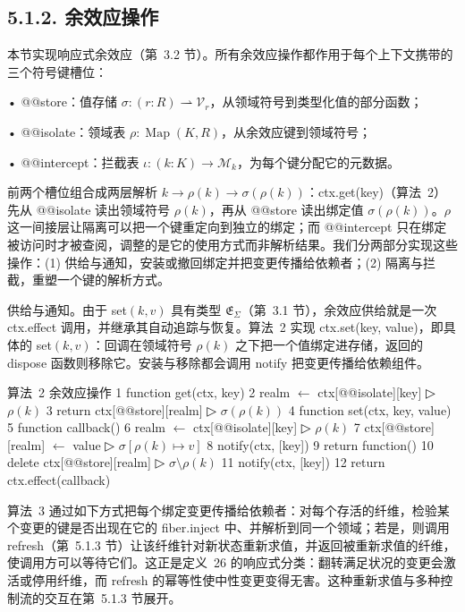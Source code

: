 \subsection{5.1.2. 余效应操作}\label{coefect-operations}

本节实现响应式余效应（第~3.2 节）。所有余效应操作都作用于每个上下文携带的三个符号键槽位：

• @@store：值存储 \(\sigma : ( r : R ) \rightharpoonup \mathcal { V } _ { r }\)，从领域符号到类型化值的部分函数；

• @@isolate：领域表 \(\rho : \operatorname { M a p } ( K , R )\)，从余效应键到领域符号；

• @@intercept：拦截表 \(\iota : ( k : K ) \to \mathcal { M } _ { k }\)，为每个键分配它的元数据。

前两个槽位组合成两层解析 \(k \to \rho ( k ) \to \sigma ( \rho ( k ) )\)：ctx.get(key)（算法~2）先从 @@isolate 读出领域符号 \(\rho ( k )\)，再从 @@store 读出绑定值 \(\sigma ( \rho ( k ) )\)。\(\rho\) 这一间接层让隔离可以把一个键重定向到独立的绑定；而 @@intercept 只在绑定被访问时才被查阅，调整的是它的使用方式而非解析结果。我们分两部分实现这些操作：(1) 供给与通知，安装或撤回绑定并把变更传播给依赖者；(2) 隔离与拦截，重塑一个键的解析方式。

供给与通知。由于 set\(( k , v )\) 具有类型 \(\mathfrak { E } _ { \Sigma }\)（第~3.1 节），余效应供给就是一次 ctx.effect 调用，并继承其自动追踪与恢复。算法~2 实现 ctx.set(key, value)，即具体的 set\(( k , v )\)：回调在领域符号 \(\rho ( k )\) 之下把一个值绑定进存储，返回的 dispose 函数则移除它。安装与移除都会调用 notify 把变更传播给依赖组件。

算法~2 余效应操作
1 function get(ctx, key)
2 realm $\leftarrow$ ctx{[}@@isolate{]}{[}key{]} ▷ $\rho ( k )$
3 return ctx{[}@@store{]}{[}realm{]} ▷ $\sigma ( \rho ( k ) )$
4 function set(ctx, key, value)
5 function callback()
6 realm $\leftarrow$ ctx{[}@@isolate{]}{[}key{]} ▷ $\rho ( k )$
7 ctx{[}@@store{]}{[}realm{]} $\leftarrow$ value ▷ $\sigma [ \rho ( k ) \mapsto v ]$
8 notify(ctx, {[}key{]})
9 return function()
10 delete ctx{[}@@store{]}{[}realm{]} ▷ $\sigma \setminus \rho ( k )$
11 notify(ctx, {[}key{]})
12 return ctx.effect(callback)

算法~3 通过如下方式把每个绑定变更传播给依赖者：对每个存活的纤维，检验某个变更的键是否出现在它的 fiber.inject 中、并解析到同一个领域；若是，则调用 refresh（第~5.1.3 节）让该纤维针对新状态重新求值，并返回被重新求值的纤维，使调用方可以等待它们。这正是定义~26 的响应式分类：翻转满足状况的变更会激活或停用纤维，而 refresh 的幂等性使中性变更变得无害。这种重新求值与多种控制流的交互在第~5.1.3 节展开。

